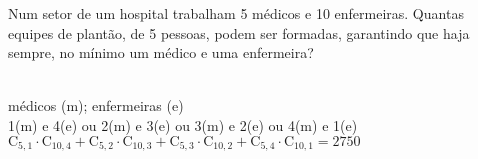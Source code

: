 \begin{ex}
 Num setor de um hospital trabalham 5 médicos e 10 enfermeiras. Quantas equipes de plantão, de 5 pessoas, podem ser formadas, garantindo que haja sempre, no mínimo um médico e uma enfermeira?
   \begin{sol}
    \phantom{A} \\
    médicos (m); enfermeiras (e) \\
    1(m) e 4(e) ou 2(m) e 3(e) ou 3(m) e 2(e) ou 4(m) e 1(e) \\
    $\mathrm{C}_{5,1}\cdot\mathrm{C}_{{10},4}+\mathrm{C}_{5,2}\cdot\mathrm{C}_{{10},3}+\mathrm{C}_{5,3}\cdot\mathrm{C}_{{10},2}+\mathrm{C}_{5,4}\cdot\mathrm{C}_{{10},1}=2750$ 
   \end{sol}
\end{ex}